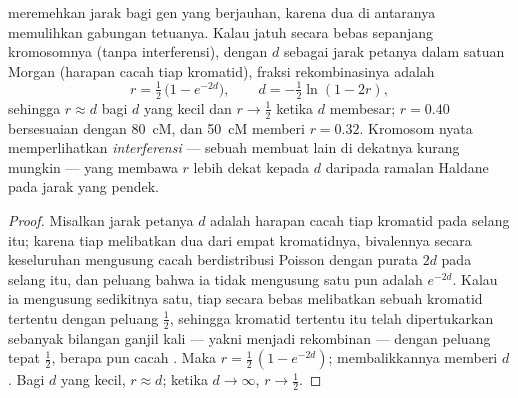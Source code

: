 \begin{theorem}\label{thm:b2:meiosis-heredity:haldane}
 meremehkan jarak bagi gen yang berjauhan, karena
dua  di antaranya memulihkan gabungan tetuanya. Kalau
 jatuh secara bebas sepanjang kromosomnya (tanpa
interferensi), dengan $d$ sebagai jarak petanya dalam satuan Morgan
(harapan cacah  tiap kromatid), fraksi rekombinasinya
adalah
\[
r = \tfrac12\,\bigl(1 - e^{-2d}\bigr), \qquad d = -\tfrac12\ln(1 - 2r),
\]
sehingga $r \approx d$ bagi $d$ yang kecil dan $r \to \tfrac12$ ketika
$d$ membesar; $r = 0.40$ bersesuaian dengan \qty{80}{cM}, dan
\qty{50}{cM} memberi $r = 0.32$. Kromosom nyata memperlihatkan
\emph{interferensi} --- sebuah  membuat  lain
di dekatnya kurang mungkin --- yang membawa $r$ lebih dekat kepada $d$
daripada ramalan Haldane pada jarak yang pendek.
\end{theorem}
\begin{proof}
Misalkan jarak petanya $d$ adalah harapan cacah  tiap
kromatid pada selang itu; karena tiap  melibatkan dua
dari empat kromatidnya, bivalennya secara keseluruhan mengusung cacah
 berdistribusi Poisson dengan purata $2d$ pada selang itu,
dan peluang bahwa ia tidak mengusung satu pun adalah $e^{-2d}$. Kalau
ia mengusung sedikitnya satu, tiap  secara bebas
melibatkan sebuah kromatid tertentu dengan peluang
$\tfrac12$, sehingga kromatid tertentu itu telah dipertukarkan
sebanyak bilangan ganjil kali --- yakni menjadi rekombinan --- dengan
peluang tepat $\tfrac12$, berapa pun cacah . Maka $r = \tfrac12\,(1 -
e^{-2d})$; membalikkannya memberi $d$. Bagi $d$ yang kecil,
$r \approx d$; ketika $d \to \infty$, $r \to \tfrac12$.
\end{proof}

